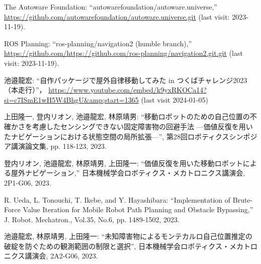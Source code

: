 \documentclass[twocolumn,9pt]{jsproceedings}
\begin{document}
\begin{thebibliography}{99}
  The Autoware Foundation: ``autowarefoundation/autoware.universe,'' \url{https://github.com/autowarefoundation/autoware.universe.git} (last visit: 2023-11-19).

  ROS Planning: ``ros-planning/navigation2 (humble branch),'' \url{https://github.com/https://github.com/ros-planning/navigation2.git.git} (last visit: 2023-11-19).


  池邉龍宏: ``自作パッケージで屋外自律移動してみた in つくばチャレンジ2023（本走行）''，
  \url{https://www.youtube.com/embed/k9yxRKOCa14?si=c7ISmE1wH5W4BhgU&amp;start=1365} (last visit 2024-01-05)

上田隆一, 登内リオン, 池邉龍宏, 林原靖男: ``移動ロボットのための自己位置の不確かさを考慮したセンシングできない固定障害物の回避手法 ---価値反復を用いたナビゲーションにおける状態空間の局所拡張---'', 第28回ロボティクスシンポジア講演論文集, pp. 118-123, 2023.

  登内リオン, 池邉龍宏, 林原靖男, 上田隆一: ``価値反復を用いた移動ロボットによる屋外ナビゲーション,''
  日本機械学会ロボティクス・メカトロニクス講演会, 2P1-G06, 2023.

  R. Ueda, L. Tonouchi, T. Ikebe, and Y. Hayashibara: ``Implementation of Brute-Force Value Iteration for Mobile Robot Path Planning and Obstacle Bypassing,''
  J. Robot. Mechatron., Vol.35, No.6, pp. 1489-1502, 2023.

  池邉龍宏, 林原靖男, 上田隆一: ``未知障害物によるモンテカルロ自己位置推定の破綻を防ぐための観測範囲の制限と選択'',
  日本機械学会ロボティクス・メカトロニクス講演会, 2A2-G06, 2023.
\end{thebibliography}
\normalsize

\clearpage

\end{document}
